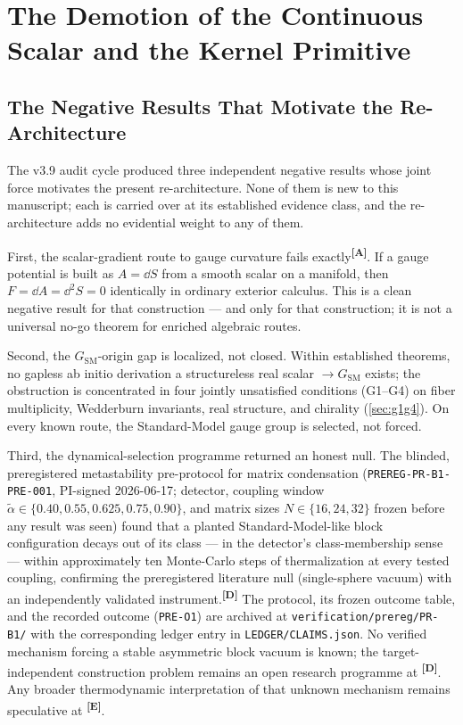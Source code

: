 \documentclass[12pt,a4paper,twoside]{article}
\theoremstyle{plain}
\theoremstyle{definition}
\theoremstyle{remark}
\newcommand{\catmark}[1]{\textsuperscript{\textsf{\textbf{[#1]}}}}
\begin{document}
\newpage
\section{The Demotion of the Continuous Scalar and the Kernel Primitive}
\label{sec:demotion}

\subsection{The Negative Results That Motivate the Re-Architecture}
\label{subsec:negative-results}

The v3.9 audit cycle produced three independent negative results whose
joint force motivates the present re-architecture. None of them is new to
this manuscript; each is carried over at its established evidence class, and the
re-architecture adds no evidential weight to any of them.

First, the scalar-gradient route to gauge curvature fails
exactly\catmark{A}. If a gauge potential is built as $A = \dd S$ from a
smooth scalar on a manifold, then $F = \dd A = \dd^2 S = 0$ identically in
ordinary exterior calculus. This is a clean negative result for that
construction --- and only for that construction; it is not a universal
no-go theorem for enriched algebraic routes.

Second, the $G_{\mathrm{SM}}$-origin gap is localized, not closed. Within
established theorems, no gapless ab initio derivation
a structureless real scalar $\to G_{\mathrm{SM}}$ exists; the obstruction is concentrated in four
jointly unsatisfied conditions (G1--G4) on fiber multiplicity, Wedderburn
invariants, real structure, and chirality
(\cref{sec:g1g4}). On every known route, the Standard-Model gauge group is
selected, not forced.

Third, the dynamical-selection programme returned an honest null. The
blinded, preregistered metastability pre-protocol for matrix condensation
(\texttt{PREREG-PR-B1-PRE-001}, PI-signed 2026-06-17; detector, coupling
window $\tilde\alpha \in \{0.40, 0.55, 0.625, 0.75, 0.90\}$, and matrix
sizes $N \in \{16, 24, 32\}$ frozen before any result was seen) found
that a planted Standard-Model-like block configuration decays out of its
class --- in the detector's class-membership sense --- within
approximately ten Monte-Carlo steps of thermalization at every tested
coupling, confirming the preregistered literature null (single-sphere
vacuum) with an independently validated instrument.\catmark{D} The
protocol, its frozen outcome table, and the recorded outcome
(\texttt{PRE-O1}) are archived at \texttt{verification/prereg/PR-B1/}
with the corresponding ledger entry in \texttt{LEDGER/CLAIMS.json}. No verified mechanism forcing a stable asymmetric block vacuum is known;
the target-independent construction problem remains an open research
programme at \catmark{D}. Any broader thermodynamic interpretation of that
unknown mechanism remains speculative at \catmark{E}.
\end{document}
